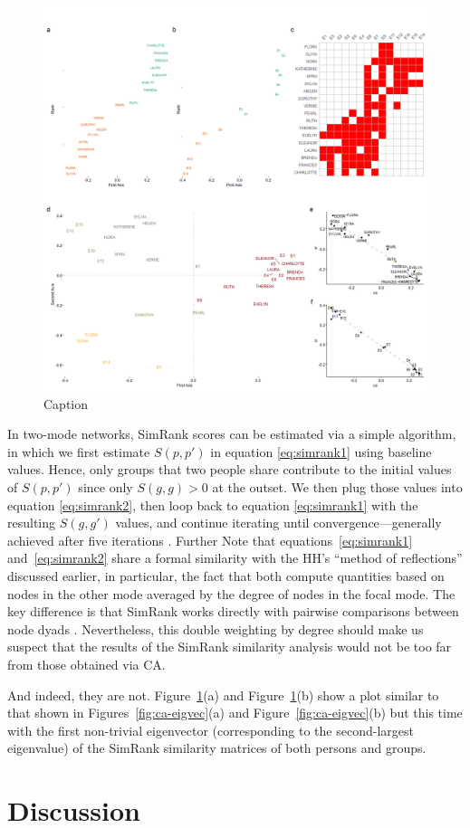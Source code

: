 \documentclass[a4paper,fleqn]{cas-sc}
\begin{document}
\begin{figure}
    \centering
    \includegraphics[width=1.0\textwidth]{Plots/sr-plot.png}
    \caption{Caption}
    \label{fig:simrank}
\end{figure}

In two-mode networks, SimRank scores can be estimated via a simple algorithm, in which we first estimate $S(p, p')$ in equation \ref{eq:simrank1} using baseline values. Hence, only groups that two people share contribute to the initial values of $S(p, p')$ since only $S(g, g)>0$ at the outset. We then plug those values into equation \ref{eq:simrank2}, then loop back to equation \ref{eq:simrank1} with the resulting $S(g, g')$ values, and continue iterating until convergence---generally achieved after five iterations \citep{jeh2002simrank}. Further Note that equations~\ref{eq:simrank1} and~\ref{eq:simrank2} share a formal similarity with the HH's ``method of reflections'' discussed earlier, in particular, the fact that both compute quantities based on nodes in the other mode averaged by the degree of nodes in the focal mode. The key difference is that SimRank works directly with pairwise comparisons between node dyads \citep{jeh2002simrank}. Nevertheless, this double weighting by degree should make us suspect that the results of the SimRank similarity analysis would not be too far from those obtained via CA.

And indeed, they are not. Figure~\ref{fig:simrank}(a) and Figure~\ref{fig:simrank}(b) show a plot similar to that shown in Figures~\ref{fig:ca-eigvec}(a) and Figure~\ref{fig:ca-eigvec}(b) but this time with the first non-trivial eigenvector (corresponding to the second-largest eigenvalue) of the SimRank similarity matrices of both persons and groups. 


\section{Discussion}
%


\end{document}
